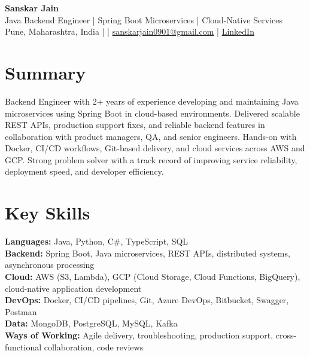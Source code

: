 \documentclass[10pt,letterpaper]{article}
\begin{document}
\begin{center}
    {\Large \textbf{Sanskar Jain}} \\
    Java Backend Engineer | Spring Boot Microservices | Cloud-Native Services \\
    Pune, Maharashtra, India \enspace |  \enspace | \enspace
    \href{mailto:sanskarjain0901@gmail.com}{sanskarjain0901@gmail.com} \enspace | \enspace
    \href{https://www.linkedin.com/in/sanskar-jain0901/}{LinkedIn}
\end{center}

\section*{Summary}
Backend Engineer with 2+ years of experience developing and maintaining Java microservices using Spring Boot in cloud-based environments. Delivered scalable REST APIs, production support fixes, and reliable backend features in collaboration with product managers, QA, and senior engineers. Hands-on with Docker, CI/CD workflows, Git-based delivery, and cloud services across AWS and GCP. Strong problem solver with a track record of improving service reliability, deployment speed, and developer efficiency.

\section*{Key Skills}
\textbf{Languages:} Java, Python, C\#, TypeScript, SQL \\
\textbf{Backend:} Spring Boot, Java microservices, REST APIs, distributed systems, asynchronous processing \\
\textbf{Cloud:} AWS (S3, Lambda), GCP (Cloud Storage, Cloud Functions, BigQuery), cloud-native application development \\
\textbf{DevOps:} Docker, CI/CD pipelines, Git, Azure DevOps, Bitbucket, Swagger, Postman \\
\textbf{Data:} MongoDB, PostgreSQL, MySQL, Kafka \\
\textbf{Ways of Working:} Agile delivery, troubleshooting, production support, cross-functional collaboration, code reviews
\end{document}

